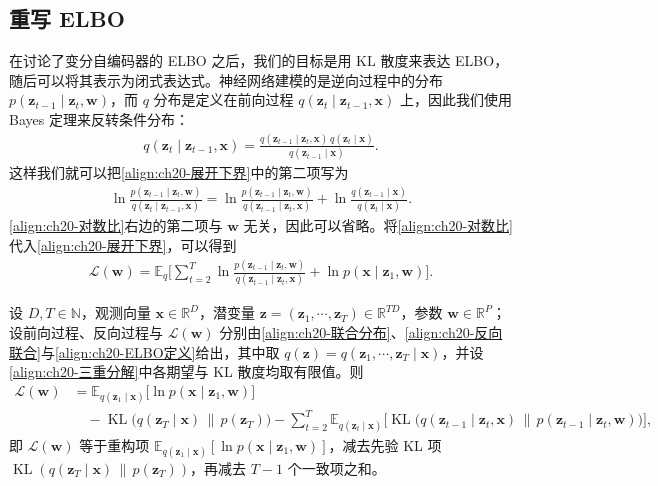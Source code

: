 \documentclass[../../main.tex]{subfiles}
\begin{document}
\subsection{重写 ELBO}\label{subsection:ch20-重写ELBO}

在讨论了变分自编码器的 ELBO 之后，我们的目标是用 KL 散度来表达 ELBO，随后可以将其表示为闭式表达式。神经网络建模的是逆向过程中的分布 $p(\bm{z}_{t-1}\mid\bm{z}_t,\bm{w})$，而 $q$ 分布是定义在前向过程 $q(\bm{z}_t\mid\bm{z}_{t-1},\bm{x})$ 上，因此我们使用 Bayes 定理来反转条件分布：
\begin{align}
q(\bm{z}_t\mid\bm{z}_{t-1},\bm{x})=\frac{q(\bm{z}_{t-1}\mid\bm{z}_t,\bm{x})\,q(\bm{z}_t\mid\bm{x})}{q(\bm{z}_{t-1}\mid\bm{x})}.
\label{align:ch20-反向Bayes}
\end{align}
这样我们就可以把\eqref{align:ch20-展开下界}中的第二项写为
\begin{align}
\ln\frac{p(\bm{z}_{t-1}\mid\bm{z}_t,\bm{w})}{q(\bm{z}_t\mid\bm{z}_{t-1},\bm{x})}=\ln\frac{p(\bm{z}_{t-1}\mid\bm{z}_t,\bm{w})}{q(\bm{z}_{t-1}\mid\bm{z}_t,\bm{x})}+\ln\frac{q(\bm{z}_{t-1}\mid\bm{x})}{q(\bm{z}_t\mid\bm{x})}.
\label{align:ch20-对数比}
\end{align}
\eqref{align:ch20-对数比}右边的第二项与 $\bm{w}$ 无关，因此可以省略。将\eqref{align:ch20-对数比}代入\eqref{align:ch20-展开下界}，可以得到
\begin{align}
\mathcal{L}(\bm{w})=\mathbb{E}_{q}\Big[\sum_{t=2}^{T}\ln\frac{p(\bm{z}_{t-1}\mid\bm{z}_t,\bm{w})}{q(\bm{z}_{t-1}\mid\bm{z}_t,\bm{x})}+\ln p(\bm{x}\mid\bm{z}_1,\bm{w})\Big].
\label{align:ch20-中间下界}
\end{align}

\begin{theorem}\label{theorem:ch20-ELBO分解}
设 $D,T\in\mathbb{N}$，观测向量 $\bm{x}\in\mathbb{R}^{D}$，潜变量 $\bm{z}=(\bm{z}_1,\cdots,\bm{z}_T)\in\mathbb{R}^{TD}$，参数 $\bm{w}\in\mathbb{R}^{P}$；设前向过程、反向过程与 $\mathcal{L}(\bm{w})$ 分别由\eqref{align:ch20-联合分布}、\eqref{align:ch20-反向联合}与\eqref{align:ch20-ELBO定义}给出，其中取 $q(\bm{z})=q(\bm{z}_1,\cdots,\bm{z}_T\mid\bm{x})$，并设\eqref{align:ch20-三重分解}中各期望与 KL 散度均取有限值。则
\begin{align}
\mathcal{L}(\bm{w})&=\mathbb{E}_{q(\bm{z}_1\mid\bm{x})}\big[\ln p(\bm{x}\mid\bm{z}_1,\bm{w})\big]\nonumber\\
&\quad-\operatorname{KL}\big(q(\bm{z}_T\mid\bm{x})\,\|\,p(\bm{z}_T)\big)-\sum_{t=2}^{T}\mathbb{E}_{q(\bm{z}_t\mid\bm{x})}\Big[\operatorname{KL}\big(q(\bm{z}_{t-1}\mid\bm{z}_t,\bm{x})\,\|\,p(\bm{z}_{t-1}\mid\bm{z}_t,\bm{w})\big)\Big],
\label{align:ch20-三重分解}
\end{align}
即 $\mathcal{L}(\bm{w})$ 等于重构项 $\mathbb{E}_{q(\bm{z}_1\mid\bm{x})}[\ln p(\bm{x}\mid\bm{z}_1,\bm{w})]$，减去先验 KL 项 $\operatorname{KL}(q(\bm{z}_T\mid\bm{x})\,\|\,p(\bm{z}_T))$，再减去 $T-1$ 个一致项之和。
\end{theorem}
\end{document}
